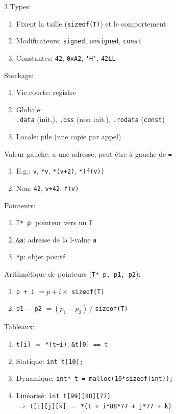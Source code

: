 \documentclass[12pt, a4paper]{article}
\begin{document}
\begin{multicols*}{3}
	Types:
	\begin{enumerate}[\roman*.]
		\item Fixent la taille (\lstinline|sizeof(T)|) et le comportement
		\item Modificateurs: \lstinline|signed|, \lstinline|unsigned|, \lstinline|const|
		\item Constantes: \lstinline|42|, \lstinline|0xA2|, \lstinline|'H'|, \lstinline|42LL|
	\end{enumerate}

	Stockage:
	\begin{enumerate}[\roman*.]
		\item Vie courte: registre
		\item Globale:\\\lstinline|.data| (init.), \lstinline|.bss| (non init.), \lstinline|.rodata| (\lstinline|const|)
		\item Locale: pile (une copie par appel)
	\end{enumerate}

	Valeur gauche: a une adresse, peut être à gauche de \lstinline|=|
	\begin{enumerate}[\roman*.]
		\item E.g.: \lstinline|v|, \lstinline|*v|, \lstinline|*(v+2)|, \lstinline|*(f(v))|
		\item Non: \lstinline|42|, \lstinline|v+42|, \lstinline|f(v)|
	\end{enumerate}

	Pointeurs:
	\begin{enumerate}[\roman*.]
		\item \lstinline|T* p|: pointeur vers un \lstinline|T|
		\item \lstinline|&a|: adresse de la l-value \lstinline|a|
		\item \lstinline|*p|: objet pointé
	\end{enumerate}

	Arithmétique de pointeurs (\lstinline|T* p, p1, p2|):
	\begin{enumerate}[\roman*.]
		\item \lstinline|p + i| $= p + i \times$ \lstinline|sizeof(T)|
		\item \lstinline|p1 - p2| $= (p_1 - p_2)\,/$ \lstinline|sizeof(T)|
	\end{enumerate}

	Tableaux:
	\begin{enumerate}[\roman*.]
		\item \lstinline|t[i]| $=$ \lstinline|*(t+i)|; \lstinline|&t[0] == t|
		\item Statique: \lstinline|int t[10];|
		\item Dynamique: \lstinline|int* t = malloc(10*sizeof(int));|
		\item Linéarisé: \lstinline|int t[99][88][77]| \\$\Rightarrow$ \lstinline|t[i][j][k]| $=$ \lstinline|*(t + i*88*77 + j*77 + k)|
	\end{enumerate}


\end{multicols*}
\end{document}
